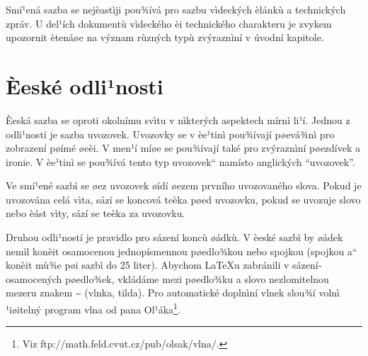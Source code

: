 \documentclass[a4paper,11pt,twocolumn]{article}
\newcommand{\myuv}[1]{\quotedblbase #1\textquotedblleft}
\begin{document}
Smí¹ená sazba se nejèastìji pou¾ívá pro sazbu vìdeckých èlánkù a technických zpráv. U del¹í­ch dokumentù vìdeckého èi technického charakteru je zvykem upozornit ètenáøe na význam rùzných typù zvýraznìní­ v úvodní­ kapitole.

\section{Èeské odli¹nosti}

Èeská sazba se oproti okolní­mu svìtu v nìkterých aspektech mí­rnì li¹í­. Jednou z odli¹ností je sazba uvozovek. Uvozovky se v èe¹tinì pou¾í­vají­ pøevá¾nì pro zobrazení­ pøí­mé øeèi. V men¹í­ míøe se pou¾í­vají­ také pro zvýraznìní­ pøezdí­vek a ironie. V èe¹tinì se pou¾í­vá tento typ \myuv{uvozovek} namísto anglických \textquotedblleft uvozovek\textquotedblright.

Ve smí¹ené sazbì se øez uvozovek øí­dí­ øezem první­ho uvozovaného slova. Pokud je uvozována celá vìta, sází­ se koncová teèka pøed uvozovku, pokud se uvozuje slovo nebo èást vìty, sází­ se teèka za uvozovku.

Druhou odli¹ností je pravidlo pro sázení­ koncù øádkù. V èeské sazbì by øádek nemìl konèit osamocenou jednopí­smennou pøedlo¾kou nebo spojkou (spojkou \myuv{a} konèit mù¾e pøi sazbì do 25 liter). Abychom LaTeXu zabránili v sázení­ osamocených pøedlo¾ek, vkládáme mezi pøedlo¾ku a slovo nezlomitelnou mezeru znakem \textasciitilde{} (vlnka, tilda). Pro automatické doplnìní vlnek slou¾í­ volnì ¹iøitelný program vlna od pana Ol¹áka\footnote{Viz ftp://math.feld.cvut.cz/pub/olsak/vlna/.}.
\end{document}
